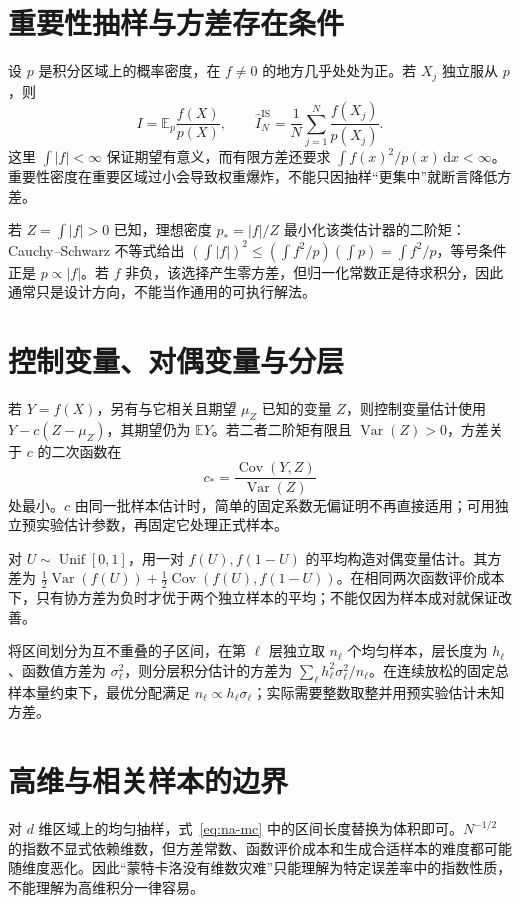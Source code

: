\section{重要性抽样与方差存在条件}
设 $p$ 是积分区域上的概率密度，在 $f\ne0$ 的地方几乎处处为正。若 $X_j$ 独立服从 $p$，则
\[
 I=\mathbb E_p\frac{f(X)}{p(X)},\qquad
 \widehat I_N^{\mathrm{IS}}=\frac1N\sum_{j=1}^N\frac{f(X_j)}{p(X_j)}.
\]
这里 $\int|f|<\infty$ 保证期望有意义，而有限方差还要求 $\int f(x)^2/p(x)\,\mathrm dx<\infty$。重要性密度在重要区域过小会导致权重爆炸，不能只因抽样“更集中”就断言降低方差。

若 $Z=\int|f|>0$ 已知，理想密度 $p_*=|f|/Z$ 最小化该类估计器的二阶矩：Cauchy--Schwarz 不等式给出 $(\int|f|)^2\le(\int f^2/p)(\int p)=\int f^2/p$，等号条件正是 $p\propto|f|$。若 $f$ 非负，该选择产生零方差，但归一化常数正是待求积分，因此通常只是设计方向，不能当作通用的可执行解法。

\section{控制变量、对偶变量与分层}
若 $Y=f(X)$，另有与它相关且期望 $\mu_Z$ 已知的变量 $Z$，则控制变量估计使用 $Y-c(Z-\mu_Z)$，其期望仍为 $\mathbb EY$。若二者二阶矩有限且 $\operatorname{Var}(Z)>0$，方差关于 $c$ 的二次函数在
\[
 c_* =\frac{\operatorname{Cov}(Y,Z)}{\operatorname{Var}(Z)}
\]
处最小。$c$ 由同一批样本估计时，简单的固定系数无偏证明不再直接适用；可用独立预实验估计参数，再固定它处理正式样本。

对 $U\sim\operatorname{Unif}[0,1]$，用一对 $f(U),f(1-U)$ 的平均构造对偶变量估计。其方差为 $\tfrac12\operatorname{Var}(f(U))+\tfrac12\operatorname{Cov}(f(U),f(1-U))$。在相同两次函数评价成本下，只有协方差为负时才优于两个独立样本的平均；不能仅因为样本成对就保证改善。

将区间划分为互不重叠的子区间，在第 $\ell$ 层独立取 $n_\ell$ 个均匀样本，层长度为 $h_\ell$、函数值方差为 $\sigma_\ell^2$，则分层积分估计的方差为 $\sum_\ell h_\ell^2\sigma_\ell^2/n_\ell$。在连续放松的固定总样本量约束下，最优分配满足 $n_\ell\propto h_\ell\sigma_\ell$；实际需要整数取整并用预实验估计未知方差。

\section{高维与相关样本的边界}
对 $d$ 维区域上的均匀抽样，式~\eqref{eq:na-mc} 中的区间长度替换为体积即可。$N^{-1/2}$ 的指数不显式依赖维数，但方差常数、函数评价成本和生成合适样本的难度都可能随维度恶化。因此“蒙特卡洛没有维数灾难”只能理解为特定误差率中的指数性质，不能理解为高维积分一律容易。


